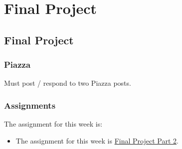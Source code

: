 \clearpage

\renewcommand{\ChapTitle}{Final Project}
\renewcommand{\SectionTitle}{Final Project}

\chapter{\ChapTitle}
\section{\SectionTitle}

\subsection{Piazza}

Must post / respond to two Piazza posts. 

\subsection{Assignments}

The assignment for this week is:

\begin{itemize}
    \item The assignment for this week is \href{https://github.com/QuantumCompiler/CU/tree/main/CSPB%203022%20-%20Introduction%20To%20Data%20Science%20With%20Probability%20And%20Statistics/CSPB%203022%20-%20Final%20Project/CSPB%203022%20-%20Final%20Project%20Part%202}{Final Project Part 2}. 
\end{itemize}